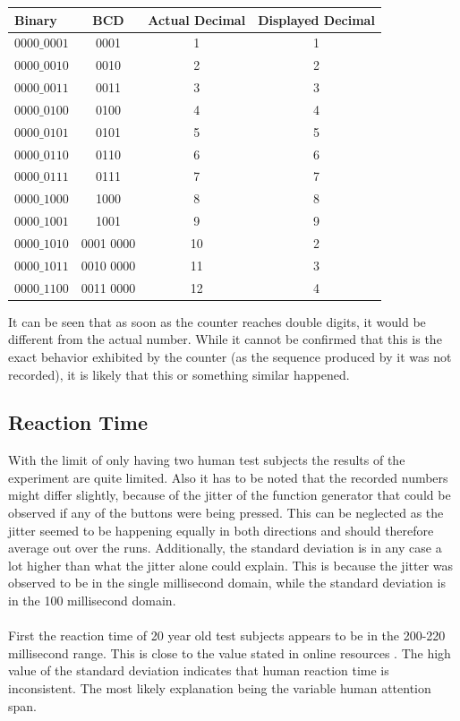 \documentclass[fleqn,14pt]{article}
\begin{document}
\vspace{0.5cm}
\begin{tabular}{lccc}
  Binary & BCD & Actual Decimal & Displayed Decimal\\
  \midrule
  $0000\_0001$ & 0001 & 1 & 1\\
  $0000\_0010$ & 0010 & 2 & 2\\
  $0000\_0011$ & 0011 & 3 & 3\\
  $0000\_0100$ & 0100 & 4 & 4\\
  $0000\_0101$ & 0101 & 5 & 5\\
  $0000\_0110$ & 0110 & 6 & 6\\
  $0000\_0111$ & 0111 & 7 & 7\\
  $0000\_1000$ & 1000 & 8 & 8\\
  $0000\_1001$ & 1001 & 9 & 9\\
  $0000\_1010$ & 0001 0000 & 10 & 2\\
  $0000\_1011$ & 0010 0000 & 11 & 3\\
  $0000\_1100$ & 0011 0000 & 12 & 4\\
\end{tabular}
\vspace{0.5cm}

It can be seen that as soon as the counter reaches double digits, it would be different from the actual
number. While it cannot be confirmed that this is the exact behavior exhibited by the counter (as the
sequence produced by it was not recorded), it is likely that this or something similar happened.\\

\subsection{Reaction Time}
With the limit of only having two human test subjects the results of the experiment are quite limited.
Also it has to be noted that the recorded numbers might differ slightly, because of the jitter of the function
generator that could be observed if any of the buttons were being pressed. This can be neglected
as the jitter seemed to be happening equally in both directions and should therefore average out
over the runs. Additionally, the standard deviation is in any case a lot higher than what the jitter alone
could explain. This is because the jitter was observed to be in the single millisecond domain, while the
standard deviation is in the 100 millisecond domain.\\
\\
First the reaction time of 20
year old test subjects appears to be in the 200-220 millisecond range. This is close to the value stated in
online resources \cite{wiki} . The high value of the standard deviation indicates that human reaction time is
inconsistent. The most likely explanation being the variable human attention span.
\end{document}
